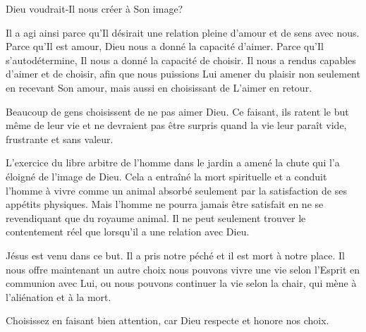 




 Dieu voudrait-Il nous créer à Son image? 

Il a agi ainsi parce qu'Il désirait une relation pleine d'amour et de sens avec
 nous. Parce qu'Il est amour, Dieu nous a donné la capacité d'aimer. Parce qu'Il
 s'autodétermine, Il nous a donné la capacité de choisir. Il nous a rendus
 capables d'aimer et de choisir, afin que nous puissions Lui amener du plaisir
 \ocadr{}non seulement en recevant Son amour, mais aussi en choisissant de L'aimer
 en retour. 

Beaucoup de gens choisissent de ne pas aimer Dieu. Ce faisant, ils ratent le but
 même de leur vie et ne devraient pas être surpris quand la vie leur paraît vide,
 frustrante et sans valeur.


L'exercice du libre arbitre de l'homme dans le jardin a amené la chute qui l'a
 éloigné de l'image de Dieu. Cela a entraîné la mort spirituelle et a conduit
 l'homme à vivre comme un animal \ocadr{}absorbé seulement par la satisfaction de ses
 appétits physiques. Mais l'homme ne pourra jamais être satisfait en ne se
 revendiquant que du royaume animal. Il ne peut seulement trouver le contentement
 réel que lorsqu'il a une relation avec Dieu. 

Jésus est venu dans ce but. Il a pris notre péché et il est mort à notre place.
 Il nous offre maintenant un autre choix \ocadr{}nous pouvons vivre une vie selon
 l'Esprit en communion avec Lui, ou nous pouvons continuer la vie selon la chair,
 qui mène à l'aliénation et à la mort. 

Choisissez en faisant bien attention, car Dieu respecte et honore nos choix. 

\dvrule




